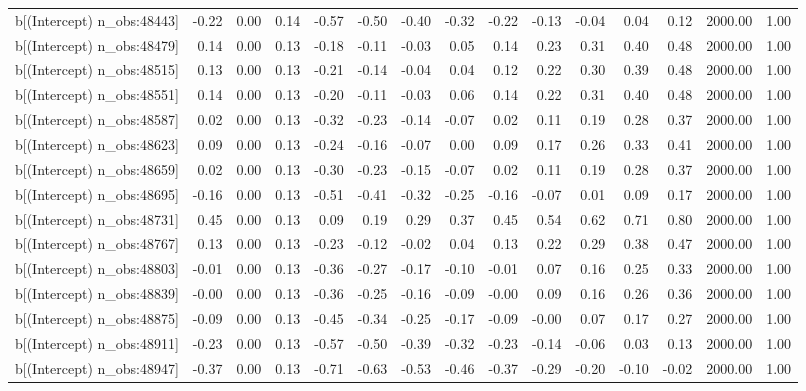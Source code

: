 \begin{table}[ht]
\begin{tabular}{rrrrrrrrrrrrrrr}
  b[(Intercept) n\_obs:48443] & -0.22 & 0.00 & 0.14 & -0.57 & -0.50 & -0.40 & -0.32 & -0.22 & -0.13 & -0.04 & 0.04 & 0.12 & 2000.00 & 1.00 \\ 
  b[(Intercept) n\_obs:48479] & 0.14 & 0.00 & 0.13 & -0.18 & -0.11 & -0.03 & 0.05 & 0.14 & 0.23 & 0.31 & 0.40 & 0.48 & 2000.00 & 1.00 \\ 
  b[(Intercept) n\_obs:48515] & 0.13 & 0.00 & 0.13 & -0.21 & -0.14 & -0.04 & 0.04 & 0.12 & 0.22 & 0.30 & 0.39 & 0.48 & 2000.00 & 1.00 \\ 
  b[(Intercept) n\_obs:48551] & 0.14 & 0.00 & 0.13 & -0.20 & -0.11 & -0.03 & 0.06 & 0.14 & 0.22 & 0.31 & 0.40 & 0.48 & 2000.00 & 1.00 \\ 
  b[(Intercept) n\_obs:48587] & 0.02 & 0.00 & 0.13 & -0.32 & -0.23 & -0.14 & -0.07 & 0.02 & 0.11 & 0.19 & 0.28 & 0.37 & 2000.00 & 1.00 \\ 
  b[(Intercept) n\_obs:48623] & 0.09 & 0.00 & 0.13 & -0.24 & -0.16 & -0.07 & 0.00 & 0.09 & 0.17 & 0.26 & 0.33 & 0.41 & 2000.00 & 1.00 \\ 
  b[(Intercept) n\_obs:48659] & 0.02 & 0.00 & 0.13 & -0.30 & -0.23 & -0.15 & -0.07 & 0.02 & 0.11 & 0.19 & 0.28 & 0.37 & 2000.00 & 1.00 \\ 
  b[(Intercept) n\_obs:48695] & -0.16 & 0.00 & 0.13 & -0.51 & -0.41 & -0.32 & -0.25 & -0.16 & -0.07 & 0.01 & 0.09 & 0.17 & 2000.00 & 1.00 \\ 
  b[(Intercept) n\_obs:48731] & 0.45 & 0.00 & 0.13 & 0.09 & 0.19 & 0.29 & 0.37 & 0.45 & 0.54 & 0.62 & 0.71 & 0.80 & 2000.00 & 1.00 \\ 
  b[(Intercept) n\_obs:48767] & 0.13 & 0.00 & 0.13 & -0.23 & -0.12 & -0.02 & 0.04 & 0.13 & 0.22 & 0.29 & 0.38 & 0.47 & 2000.00 & 1.00 \\ 
  b[(Intercept) n\_obs:48803] & -0.01 & 0.00 & 0.13 & -0.36 & -0.27 & -0.17 & -0.10 & -0.01 & 0.07 & 0.16 & 0.25 & 0.33 & 2000.00 & 1.00 \\ 
  b[(Intercept) n\_obs:48839] & -0.00 & 0.00 & 0.13 & -0.36 & -0.25 & -0.16 & -0.09 & -0.00 & 0.09 & 0.16 & 0.26 & 0.36 & 2000.00 & 1.00 \\ 
  b[(Intercept) n\_obs:48875] & -0.09 & 0.00 & 0.13 & -0.45 & -0.34 & -0.25 & -0.17 & -0.09 & -0.00 & 0.07 & 0.17 & 0.27 & 2000.00 & 1.00 \\ 
  b[(Intercept) n\_obs:48911] & -0.23 & 0.00 & 0.13 & -0.57 & -0.50 & -0.39 & -0.32 & -0.23 & -0.14 & -0.06 & 0.03 & 0.13 & 2000.00 & 1.00 \\ 
  b[(Intercept) n\_obs:48947] & -0.37 & 0.00 & 0.13 & -0.71 & -0.63 & -0.53 & -0.46 & -0.37 & -0.29 & -0.20 & -0.10 & -0.02 & 2000.00 & 1.00 \\ 

\end{tabular}
\end{table}
